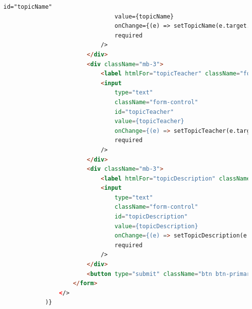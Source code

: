 \documentclass[14pt]{extarticle} %
\begin{document}
\begin{lstlisting}[language=html, caption={Клиентская часть SuggestTopic}]
                                id="topicName"
                                value={topicName}
                                onChange={(e) => setTopicName(e.target.value)}
                                required
                            />
                        </div>
                        <div className="mb-3">
                            <label htmlFor="topicTeacher" className="form-label">Научный руководитель</label>
                            <input
                                type="text"
                                className="form-control"
                                id="topicTeacher"
                                value={topicTeacher}
                                onChange={(e) => setTopicTeacher(e.target.value)}
                                required
                            />
                        </div>
                        <div className="mb-3">
                            <label htmlFor="topicDescription" className="form-label">Описание</label>
                            <input
                                type="text"
                                className="form-control"
                                id="topicDescription"
                                value={topicDescription}
                                onChange={(e) => setTopicDescription(e.target.value)}
                                required
                            />
                        </div>
                        <button type="submit" className="btn btn-primary">Предложить</button>
                    </form>
                </>
            )}


\end{lstlisting}
\end{document}
